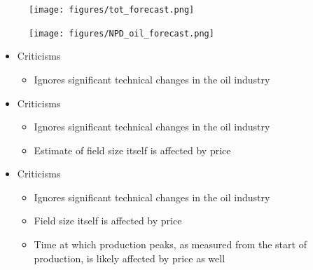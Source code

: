 \documentclass{beamer}
\begin{document}
\begin{frame}[plain]
	\begin{figure}
		\texttt{[image: figures/tot\_forecast.png]}
		
		\label{tot_forecast}
	\end{figure}
\end{frame}


\begin{frame}[plain]
\begin{figure}
		\texttt{[image: figures/NPD\_oil\_forecast.png]}
		
		\label{NPD_oil_forecast}
	\end{figure}
\end{frame}

\begin{frame}[plain]
	\begin{itemize}
	\item[] Criticisms
		\begin{itemize}
			\item Ignores significant technical changes in the oil industry
		\end{itemize}
	\end{itemize}
\end{frame}

\begin{frame}[plain]
	\begin{itemize}
	\item[] Criticisms
		\begin{itemize}
			\item Ignores significant technical changes in the oil industry
			\item Estimate of field size itself is affected by price
		\end{itemize}
	\end{itemize}
\end{frame}

\begin{frame}[plain]
	\begin{itemize}
	\item[] Criticisms
		\begin{itemize}
			\item Ignores significant technical changes in the oil industry
			\item Field size itself is affected by price
			\item Time at which production peaks, as measured from the start of production, is likely affected by price as well
		\end{itemize}
	\end{itemize}
\end{frame}
\end{document}
